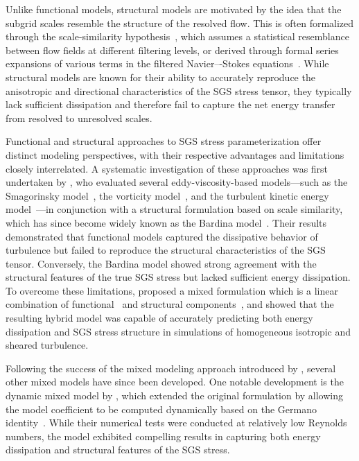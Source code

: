 \documentclass[final,3p]{elsarticle}
\begin{document}
Unlike functional models, structural models are motivated by the idea that the subgrid scales resemble the structure of the resolved flow. This is often formalized through the scale-similarity hypothesis~\cite{bardina1980improved,liu1994properties,bardina1983improved}, which assumes a statistical resemblance between flow fields at different filtering levels, or derived through formal series expansions of various terms in the filtered Navier–-Stokes equations~\cite{carati2001modelling,winckelmans2002comparison}. While structural models are known for their ability to accurately reproduce the anisotropic and directional characteristics of the SGS stress tensor, they typically lack sufficient dissipation and therefore fail to capture the net energy transfer from resolved to unresolved scales.

Functional and structural approaches to SGS stress parameterization offer distinct modeling perspectives, with their respective advantages and limitations closely interrelated. A systematic investigation of these approaches was first undertaken by \citet{bardina1983improved}, who evaluated several eddy-viscosity-based models—such as the Smagorinsky model~\cite{smagorinsky1963}, the vorticity model~\cite{kwak1975three}, and the turbulent kinetic energy model~\cite{bardina1983improved}—in conjunction with a structural formulation based on scale similarity, which has since become widely known as the Bardina model~\cite{bardina1983improved}.
Their results demonstrated that functional models captured the dissipative behavior of turbulence but failed to reproduce the structural characteristics of the SGS tensor. Conversely, the Bardina model showed strong agreement with the structural features of the true SGS stress but lacked sufficient energy dissipation. To overcome these limitations, \citet{bardina1980improved} proposed a mixed formulation which is a linear combination of functional~\cite{smagorinsky1963} and structural components~\cite{bardina1983improved}, and showed that the resulting hybrid model was capable of accurately predicting both energy dissipation and SGS stress structure in simulations of homogeneous isotropic and sheared turbulence.

Following the success of the mixed modeling approach introduced by \citet{bardina1983improved}, several other mixed models have since been developed. One notable development is the dynamic mixed model by \citet{zang1993dynamic}, which extended the original formulation by allowing the model coefficient to be computed dynamically based on the Germano identity~\cite{germano1991dynamic}. While their numerical tests were conducted at relatively low Reynolds numbers, the model exhibited compelling results in capturing both energy dissipation and structural features of the SGS stress.
\end{document}
